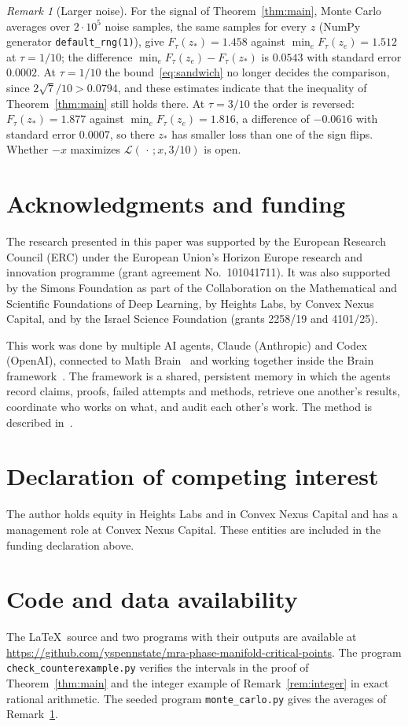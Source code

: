 \documentclass[11pt]{article}
\theoremstyle{remark}
\newtheorem{remark}[theorem]{Remark}
\begin{document}
\begin{remark}[Larger noise]\label{rem:noise}
For the signal of Theorem~\ref{thm:main}, Monte Carlo averages over $2\cdot10^5$ noise samples, the same samples for every $z$ (NumPy generator \texttt{default\_rng(1)}), give $F_\tau(z_*)=1.458$ against $\min_eF_\tau(z_e)=1.512$ at $\tau=1/10$; the difference $\min_eF_\tau(z_e)-F_\tau(z_*)$ is $0.0543$ with standard error $0.0002$. At $\tau=1/10$ the bound~\eqref{eq:sandwich} no longer decides the comparison, since $2\sqrt7/10>0.0794$, and these estimates indicate that the inequality of Theorem~\ref{thm:main} still holds there. At $\tau=3/10$ the order is reversed: $F_\tau(z_*)=1.877$ against $\min_eF_\tau(z_e)=1.816$, a difference of $-0.0616$ with standard error $0.0007$, so there $z_*$ has smaller loss than one of the sign flips. Whether $-x$ maximizes $\mathcal L(\,\cdot\,;x,3/10)$ is open.
\end{remark}

\section*{Acknowledgments and funding}
The research presented in this paper was supported by the European Research Council (ERC) under the European Union's Horizon Europe research and innovation programme (grant agreement No.~101041711). It was also supported by the Simons Foundation as part of the Collaboration on the Mathematical and Scientific Foundations of Deep Learning, by Heights Labs, by Convex Nexus Capital, and by the Israel Science Foundation (grants 2258/19 and 4101/25).

This work was done by multiple AI agents, Claude (Anthropic) and Codex (OpenAI), connected to Math Brain~\cite{MathBrainRepo} and working together inside the Brain framework~\cite{BrainFramework}. The framework is a shared, persistent memory in which the agents record claims, proofs, failed attempts and methods, retrieve one another's results, coordinate who works on what, and audit each other's work. The method is described in~\cite{MathBrainPaper}.

\section*{Declaration of competing interest}
The author holds equity in Heights Labs and in Convex Nexus Capital and has a management role at Convex Nexus Capital. These entities are included in the funding declaration above.

\section*{Code and data availability}
The \LaTeX\ source and two programs with their outputs are available at \url{https://github.com/yspennstate/mra-phase-manifold-critical-points}. The program \texttt{check\_counterexample.py} verifies the intervals in the proof of Theorem~\ref{thm:main} and the integer example of Remark~\ref{rem:integer} in exact rational arithmetic. The seeded program \texttt{monte\_carlo.py} gives the averages of Remark~\ref{rem:noise}.
\end{document}
